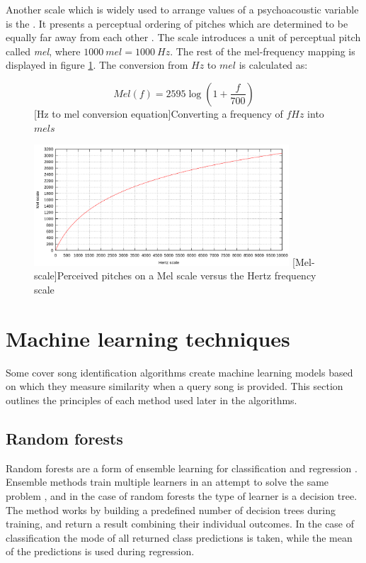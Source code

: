 Another scale which is widely used to arrange values of a psychoacoustic
variable is the . It presents a perceptual ordering of pitches
which are determined to be equally far away from each other
\cite{stevens1937scale}. The scale introduces a unit of perceptual pitch called
\textit{mel}, where $1000\:mel = 1000\:Hz$. The rest of the mel-frequency
mapping is displayed in figure \ref{fig:melscale}. The conversion from $Hz$ to
$mel$ is calculated as:
\begin{figure}
    \begin{equation}
       Mel(f) = 2595\log{}(1 + \frac{f}{700})
    \end{equation}
    [Hz to mel conversion equation]{Converting a frequency of $f Hz$ into $mels$}
\end{figure}

\begin{figure}[H]
    \centering
    \includegraphics[width=0.85\textwidth]{BackgroundTheory/mel-scale.png}
    [Mel-scale]{Perceived pitches on a Mel scale versus the Hertz frequency scale \cite{wiki:melscale}}
    \label{fig:melscale}
\end{figure}

\section{Machine learning techniques}
\label{sec:machinelearning}
Some cover song identification algorithms create machine learning models based
on which they measure similarity when a query song is provided. This section
outlines the principles of each method used later in the algorithms.

\subsection{Random forests}
\label{subsec:randomforests}
Random forests are a form of ensemble learning for classification and regression
\cite{ho1995random}. Ensemble methods train multiple learners in an attempt to
solve the same problem \cite{zhou2012ensemble}, and in the case of random
forests the type of learner is a decision tree. The method works by building a
predefined number of decision trees during training, and return a result
combining their individual outcomes. In the case of classification the mode of
all returned class predictions is taken, while the mean of the predictions is
used during regression. 

